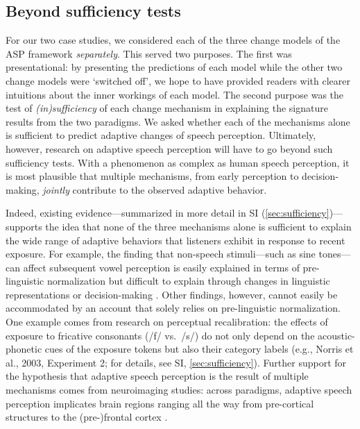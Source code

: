 \documentclass[
  11pt,
  man,floatsintext]{apa6}
\begin{document}
\hypertarget{beyond-sufficiency-tests}{%
\subsection{Beyond sufficiency tests}\label{beyond-sufficiency-tests}}

For our two case studies, we considered each of the three change models of the ASP framework \emph{separately}. This served two purposes. The first was presentational: by presenting the predictions of each model while the other two change models were `switched off', we hope to have provided readers with clearer intuitions about the inner workings of each model. The second purpose was the test of \emph{(in)sufficiency} of each change mechanism in explaining the signature results from the two paradigms. We asked whether each of the mechanisms alone is sufficient to predict adaptive changes of speech perception. Ultimately, however, research on adaptive speech perception will have to go beyond such sufficiency tests. With a phenomenon as complex as human speech perception, it is most plausible that multiple mechanisms, from early perception to decision-making, \emph{jointly} contribute to the observed adaptive behavior.

Indeed, existing evidence---summarized in more detail in SI (\ref{sec:sufficiency})---supports the idea that none of the three mechanisms alone is sufficient to explain the wide range of adaptive behaviors that listeners exhibit in response to recent exposure. For example, the finding that non-speech stimuli---such as sine tones---can affect subsequent vowel perception \autocites[e.g.,][]{holt2001,holt2006,huang-holt2011} is easily explained in terms of pre-linguistic normalization but difficult to explain through changes in linguistic representations or decision-making \autocite[see also][]{chodroff-wilson2020}. Other findings, however, cannot easily be accommodated by an account that solely relies on pre-linguistic normalization. One example comes from research on perceptual recalibration: the effects of exposure to fricative consonants (/f/ vs.~/s/) do not only depend on the acoustic-phonetic cues of the exposure tokens but also their category labels (e.g., Norris et al., 2003, Experiment 2; for details, see SI, \ref{sec:sufficiency}). Further support for the hypothesis that adaptive speech perception is the result of multiple mechanisms comes from neuroimaging studies: across paradigms, adaptive speech perception implicates brain regions ranging all the way from pre-cortical structures \autocites[e.g., in the brain stem,][]{chandrasekaran2009,polonenko2021,zhao2018} to the (pre-)frontal cortex \autocite{hickok-poeppel2007,blanco-elorriera2021,defenderfer2021}.
\end{document}
